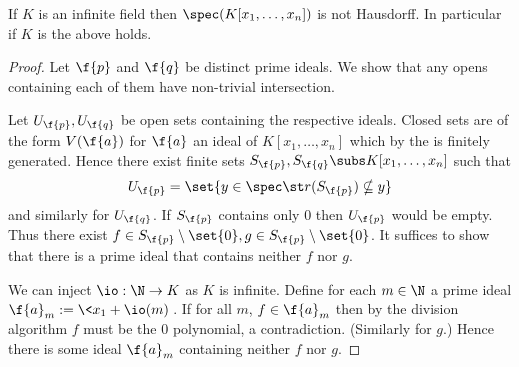 \begin{prop}
    If $K$ is an infinite field then 
    $\spec(K[x_1,\dots,x_n])$ is not Hausdorff.
    In particular if $K$ is 
     the above holds.
\end{prop}
\begin{proof}
    Let $\f{p}$ and $\f{q}$ be distinct prime ideals.
    We show that any opens containing 
    each of them have non-trivial intersection.

    Let $U_\f{p}, U_\f{q}$ be open sets containing the respective ideals.
    Closed sets are of the form $V(\f{a})$ for $\f{a}$ an ideal of 
    $K[x_1,\dots,x_n]$ which by the 
     is finitely generated.
    Hence there exist finite sets $S_\f{p},S_\f{q} \subs K[x_1,\dots,x_n]$
    such that
    \[U_\f{p} = \set{y \in \spec \st r(S_\f{p}) \nsubseteq y}\]
    and similarly for $U_\f{q}$.
    If $S_\f{p}$ contains only $0$ then $U_\f{p}$ would be empty.
    Thus there exist 
    $f \in S_\f{p} \setminus \set{0}, g \in S_\f{p} \setminus \set{0}$.
    It suffices to show that there is a prime ideal that contains neither 
    $f$ nor $g$.

    We can inject $\io : \N \to K$ as $K$ is infinite.
    Define for each $m \in \N$ a prime ideal $\f{a}_m := \<x_1 + \io(m)\>$.
    If for all $m$, $f \in \f{a}_m$ then by the division algorithm $f$
    must be the $0$ polynomial, a contradiction. 
    (Similarly for $g$.) 
    Hence there is some ideal $\f{a}_m$ containing neither $f$ nor $g$.
\end{proof}